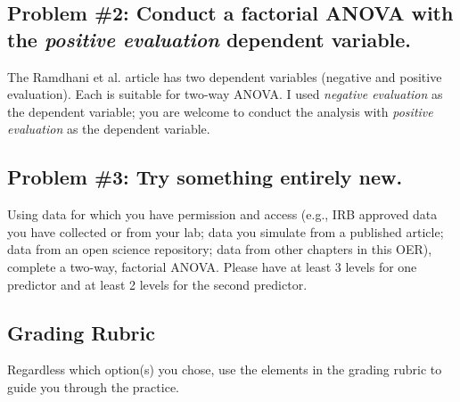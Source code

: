 \documentclass[
  11pt,
]{book}
\begin{document}
\hypertarget{problem-2-conduct-a-factorial-anova-with-the-positive-evaluation-dependent-variable.}{%
\subsection{\texorpdfstring{Problem \#2: Conduct a factorial ANOVA with the \emph{positive evaluation} dependent variable.}{Problem \#2: Conduct a factorial ANOVA with the positive evaluation dependent variable.}}\label{problem-2-conduct-a-factorial-anova-with-the-positive-evaluation-dependent-variable.}}

The Ramdhani et al. \citeyearpar{ramdhani_affective_2018} article has two dependent variables (negative and positive evaluation). Each is suitable for two-way ANOVA. I used \emph{negative evaluation} as the dependent variable; you are welcome to conduct the analysis with \emph{positive evaluation} as the dependent variable.

\hypertarget{problem-3-try-something-entirely-new.-1}{%
\subsection{Problem \#3: Try something entirely new.}\label{problem-3-try-something-entirely-new.-1}}

Using data for which you have permission and access (e.g., IRB approved data you have collected or from your lab; data you simulate from a published article; data from an open science repository; data from other chapters in this OER), complete a two-way, factorial ANOVA. Please have at least 3 levels for one predictor and at least 2 levels for the second predictor.

\hypertarget{grading-rubric-2}{%
\subsection{Grading Rubric}\label{grading-rubric-2}}

Regardless which option(s) you chose, use the elements in the grading rubric to guide you through the practice.
\end{document}
